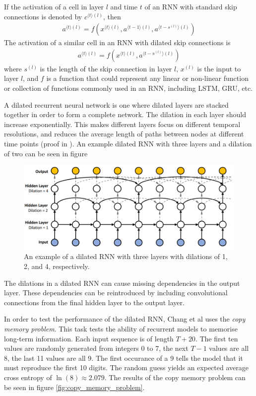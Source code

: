 \documentclass[a4paper,12pt]{article}
\theoremstyle{definition}
\begin{document}
If the activation of a cell in layer $l$ and time $t$ of an RNN with standard skip connections is denoted by $c^{\langle t \rangle(l)}$, then 
\begin{align}
	a^{\langle t \rangle(l)} = f\left(x^{\langle t \rangle(l)}, a^{\langle t - 1 \rangle(l)}, a^{\langle t - s^{(l)} \rangle(l)}\right)
\end{align}
The activation of a similar cell in an RNN with dilated skip connections is
\begin{align}
	a^{\langle t \rangle(l)} = f\left(x^{\langle t \rangle(l)}, a^{\langle t - s^{(l)} \rangle(l)}\right)
\end{align}
where $s^{(l)}$ is the length of the skip connection in layer $l$, $x^{(l)}$ is the input to layer $l$, and $f$ is a function that could represent any linear or non-linear function or collection of functions commonly used in an RNN, including LSTM, GRU, etc.

A dilated recurrent neural network is one where dilated layers are stacked together in order to form a complete network. The dilation in each layer should increase exponentially. This makes different layers focus on different temporal resolutions, and reduces the average length of paths between nodes at different time points (proof in \cite{chang}). An example dilated RNN with three layers and a dilation of two can be seen in figure 

\begin{figure}[ht]
	\centering
	\includegraphics[width=\textwidth]{figures/dilated_rnn.png}
	\caption{An example of a dilated RNN with three layers with dilations of 1, 2, and 4, respectively.}
	\label{fig:dilated_rnn}
\end{figure}

The dilations in a dilated RNN can cause missing dependencies in the output layer. These dependencies can be reintroduced by including convolutional connections from the final hidden layer to the output layer.

In order to test the performance of the dilated RNN, Chang et al uses the \textit{copy memory problem}. This task tests the ability of recurrent models to memorise long-term information. Each input sequence is of length $T+ 20$. The first ten values are randomly generated from integers 0 to 7, the next $T-1$ values are all 8, the last 11 values are all 9. The first occurance of a 9 tells the model that it must reproduce the first 10 digits. The random guess yields an expected average cross entropy of $\ln(8) \approx 2.079$. The results of the copy memory problem can be seen in figure \ref{fig:copy_memory_problem}.
\end{document}
